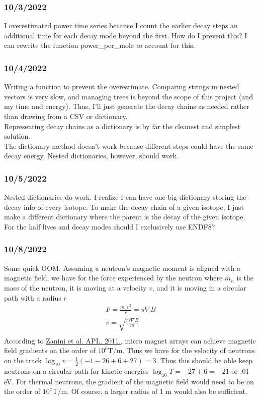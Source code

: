 \documentclass[12pt]{article}
\begin{document}
\subsubsection{10/3/2022}
I overestimated power time series because I count the earlier decay steps an additional time for each decay mode beyond the first. How do I prevent this? 
I can rewrite the function power\_per\_mole to account for this. 
\subsubsection{10/4/2022}
Writing a function to prevent the overestimate. Comparing strings in nested vectors is very slow, and managing trees is beyond the scope of this project (and my time and energy). Thus, I'll just generate the decay chains as needed rather than drawing from a CSV or dictionary.\\
Representing decay chains as a dictionary is by far the cleanest and simplest solution.  \\
The dictionary method doesn't work because different steps could have the same decay energy. Nested dictionaries, however, should work. 
\subsubsection{10/5/2022}
Nested dictionaries do work. I realize I can have one big dictionary storing the decay info of every isotope. To make the decay chain of a given isotope, I just make a different dictionary where the parent is the decay of the given isotope. \\
For the half lives and decay modes should I exclusively use ENDF8? 
\subsubsection{10/8/2022}
Some quick OOM. Assuming a neutron's magnetic moment is aligned with a magnetic field, we have for the force experienced by the neutron where $m_n$ is the mass of the neutron, it is moving at a velocity $v$, and it is moving in a circular path with a radius $r$
\begin{equation}
\begin{split}
F= \frac{m_nv^2}{r} = s\nabla B\\
v = \sqrt{\frac{rs\nabla B}{m}}\\
\end{split}
\end{equation}
According to \href{https://doi.org/10.1063/1.3664092}{Zanini et al. APL. 2011.},
micro magnet arrays can achieve magnetic field gradients on the order of $10^6$T/m. Thus we have for the velocity of neutrons on the track $\log_{10}v = \frac{1}{2}(-1 - 26 + 6 + 27) = 3$. Thus this should be able keep neutrons on a circular path for kinetic energies $\log_{10}T = -27 + 6 = -21$ or .01 eV. For thermal neutrons, the gradient of the magnetic field would need to be on the order of $10^7$T/m. Of course, a larger radius of 1 m would also be sufficient.
\end{document}
